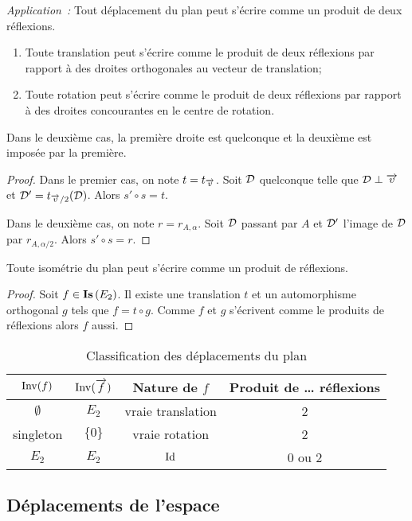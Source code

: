 \emph{Application~:} Tout déplacement du plan peut s'écrire comme un produit de
deux réflexions.
\begin{enumerate}
  \item Toute translation peut s'écrire comme le produit de deux réflexions par
    rapport à des droites orthogonales au vecteur de translation;
  \item Toute rotation peut s'écrire comme le produit de deux réflexions par
    rapport à des droites concourantes en le centre de rotation.
\end{enumerate}

Dans le deuxième cas, la première droite est quelconque et la deuxième est
imposée par la première.

\begin{proof}
  Dans le premier cas, on note \(t=t_{\overrightarrow{v}}\). Soit \(\mathcal{D}\) quelconque telle que
  \(\mathcal{D} \perp \overrightarrow{v}\) et \(\mathcal{D}'=t_{\overrightarrow{v}/2}(\mathcal{D})\). Alors \(s'\circ s=t\).

  Dans le deuxième cas, on note \(r=r_{A, \alpha}\). Soit \(\mathcal{D}\) passant par
  \(A\) et \(\mathcal{D}'\) l'image de \(\mathcal{D}\) par \(r_{A,\alpha/2}\). Alors \(s'\circ
  s=r\).
\end{proof}

\begin{cor}
  Toute isométrie du plan peut s'écrire comme un produit de réflexions.
\end{cor}
\begin{proof}
  Soit \(f \in \mathbf{Is}\left(E_2\right)\). Il existe une translation \(t\) et un automorphisme
  orthogonal \(g\) tels que \(f=t \circ g\). Comme \(f\) et \(g\) s'écrivent
  comme le produits de réflexions alors \(f\) aussi.
\end{proof}

\begin{table}
  \centering
  \begin{tabular}{|c|c|c|c|}\hline
    \(\operatorname{Inv}(f)\) & \(\operatorname{Inv}(\overrightarrow{f})\) & Nature de \(f\) & Produit de \ldots
    réflexions \\ \hline
    \(\emptyset\) & \(E_2\) & vraie translation & 2 \\
    singleton & \(\{0\}\)& vraie rotation & 2 \\
    \(E_2\) & \(E_2\) & \(\operatorname{Id}\) & 0 ou 2 \\ \hline
  \end{tabular}
  \caption{Classification des déplacements du plan}
  \label{tab:classdéplacementsplan}
\end{table}

\subsection{Déplacements de l'espace}

